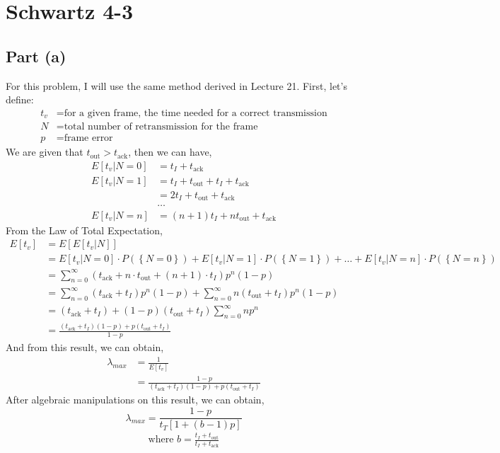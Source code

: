 \documentclass{article}
\begin{document}
\section*{Schwartz 4-3}
	\subsection*{Part (a)}
		For this problem, I will use the same method derived in Lecture 21.
		First, let's define:
		\begin{align*}
			t_v &= \text{for a given frame, the time needed for a correct transmission} \\
			N &= \text{total number of retransmission for the frame} \\
			p &= \text{frame error}
		\end{align*}
		We are given that $t_{\text{out}} > t_{\text{ack}}$, then we can have,
		\begin{align*}
			E[t_{v} | N = 0] &= t_I + t_{\text{ack}} \\
			E[t_{v} | N = 1] &= t_I + t_{\text{out}} + t_I + t_{\text{ack}} \\
			&= 2t_I + t_{\text{out}} + t_{\text{ack}} \\
			&\ldots \\
			E[t_{v} | N = n] &= (n+1)t_I + nt_{\text{out}} + t_{\text{ack}}
		\end{align*}
		From the Law of Total Expectation,
		\begin{align*}
			E[t_v] &= E[E[t_v | N]] \\
			&= E[t_v | N = 0] \cdot P(\left\{ N = 0\right\}) + E[t_v | N = 1] \cdot P(\left\{ N = 1\right\}) + \ldots + E[t_v | N = n] \cdot P(\left\{ N = n\right\}) \\
			&= \sum_{n=0}^{\infty} (t_{\text{ack}} + n \cdot t_{\text{out}} + (n+1) \cdot t_I) p^{n}(1-p) \\
			&= \sum_{n=0}^{\infty} (t_{\text{ack}} + t_I) p^{n}(1-p) + \sum_{n=0}^{\infty} n(t_{\text{out}} + t_I) p^{n}(1-p) \\
			&= (t_{\text{ack}} + t_I) + (1-p)(t_{\text{out}} + t_I)\sum_{n=0}^{\infty} np^{n} \\
			&= \frac{(t_{\text{ack}} + t_I)(1-p) + p(t_{\text{out}} + t_I)}{1-p}
		\end{align*}
		And from this result, we can obtain,
		\begin{align*}
			\lambda_{max} &= \frac{1}{E[t_v]} \\
			&= \frac{1-p}{(t_{\text{ack}} + t_I)(1-p) + p(t_{\text{out}} + t_I)}
		\end{align*}
		After algebraic manipulations on this result, we can obtain,
		\begin{equation}
			\lambda_{max} = \frac{1-p}{t_{T}[1 + (b-1)p]}
		\end{equation}
		\begin{align*}
			\text{where } b = \frac{t_I + t_{\text{out}}}{t_I + t_{\text{ack}}}
		\end{align*}
\end{document}
